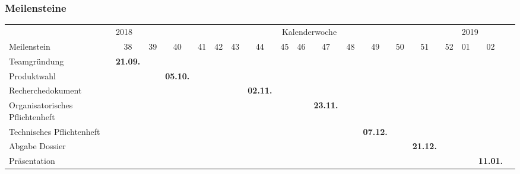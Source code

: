 \renewcommand{\arraystretch}{2.}
\subsubsection{Meilensteine}

\begin{sidewaystable}[H]
\small
\begin{tabular}{l|c|c|c|c|c|c|c|c|c|c|c|c|c|c|c|c|c|c}
                                  &\multicolumn{2}{l}{\tiny 2018}&\multicolumn{13}{c}{Kalenderwoche} &\multicolumn{2}{l}{\tiny 2019}    \\
Meilenstein                       & 38   & 39 & 40 & 41 & 42 & 43 & 44 & 45 & 46 & 47 & 48 & 49 & 50 & 51 & 52 & 01   & 02 \\
\hline
Teamgründung                      & \cellcolor{blau}\tiny \textbf{21.09.} &          &          &          &          &          &          &          &          &          &          &          &          &          &          &          &          \\
Produktwahl                       &          &          & \cellcolor{blau}\tiny \textbf{05.10.} &          &          &          &          &          &          &          &          &          &          &          &          &          &          \\
Recherchedokument                 &          &          &          &          &          &          & \cellcolor{blau}\tiny \textbf{02.11.} &          &          &          &          &          &          &          &          &          &          \\
Organisatorisches Pflichtenheft   &          &          &          &          &          &          &          &          &          & \cellcolor{blau}\tiny \textbf{23.11.} &          &          &          &          &          &          &          \\
Technisches Pflichtenheft         &          &          &          &          &          &          &          &          &          &          &          & \cellcolor{blau}\tiny \textbf{07.12.} &          &          &          &          &          \\
Abgabe Dossier                    &          &          &          &          &          &          &          &          &          &          &          &          &          & \cellcolor{blau}\tiny \textbf{21.12.} &          &          &          \\
Präsentation                      &          &          &          &          &          &          &          &          &          &          &          &          &          &          &          &          & \cellcolor{blau}\tiny \textbf{11.01.}
\end{tabular}
\end{sidewaystable}


